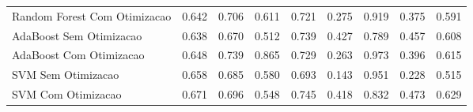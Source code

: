 \begin{table}[H]
\begin{adjustwidth}{ -1in }{ -1in }
\begin{tabular}{lrrrrrrrr}
      Random Forest Com Otimizacao &                        0.642 &                         0.706 &                            0.611 &                            0.721 &                          0.275 &                          0.919 &                                     0.375 &                                 0.591 \\
           AdaBoost Sem Otimizacao &                        0.638 &                         0.670 &                            0.512 &                            0.739 &                          0.427 &                          0.789 &                                     0.457 &                                 0.608 \\
           AdaBoost Com Otimizacao &                        0.648 &                         0.739 &                            0.865 &                            0.729 &                          0.263 &                          0.973 &                                     0.396 &                                 0.615 \\
                SVM Sem Otimizacao &                        0.658 &                         0.685 &                            0.580 &                            0.693 &                          0.143 &                          0.951 &                                     0.228 &                                 0.515 \\
                SVM Com Otimizacao &                        0.671 &                         0.696 &                            0.548 &                            0.745 &                          0.418 &                          0.832 &                                     0.473 &                                 0.629 \\
\bottomrule
\end{tabular}
    \end{adjustwidth}
    \renewcommand{\arraystretch}{1.0} %
\end{table}
